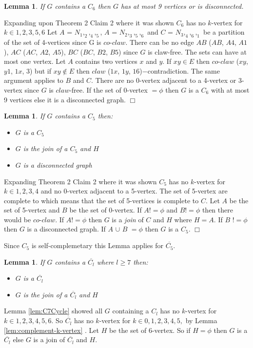 \documentclass[12pt]{article}
\newtheorem{Lemma}[Theorem]{Lemma}
\begin{document}
\begin{Lemma}\label{lem:C69V}
If $G$ contains a $C_6$ then $G$ has at most 9 vertices or is disconnected.
\end{Lemma}
 Expanding \cite{BraFud2002} upon Theorem 2 Claim 2 where it was shown $C_6$ has no $k$-vertex for $k \in {1, 2, 3, 5, 6}$ Let $A$ = $N_1,_2,_4,_5$, $A$ = $N_2,_3,_5,_6$ and $C$ = $N_3,_4,_6,_1$ be a partition of the set of 4-vertices since G is $co$-$claw$. There can be no edge $AB$ ($AB$, $A4$, $A1$), $AC$ ($AC$, $A2$, $A5$), $BC$ ($BC$, $B2$, $B5$) since $G$ is claw-free. The sets can have at most one vertex. Let $A$ contains two vertices $x$ and $y$. If $xy \in E$ then $co$-$claw$ ($xy$, $y1$, $1x$, $3$) but if $xy \not\in E$ then $claw$ ($1x$, $1y$, $16$)$-$contradiction. The same argument applies to $B$ and $C$. There are no 0-vertex adjacent to a 4-vertex or 3-vertex since $G$ is $claw$-free. If the set of 0-vertex $= \phi$ then $G$ is a $C_6$ with at most 9 vertices else it is a disconnected graph.  $\Box$



\medskip

\begin{Lemma}\label{lem:c5join}
If $G$ contains a $C_5$ then:
\begin{itemize}
\item[(i)]
$G$ is a $C_5$
\item[(i)]
$G$ is the join of a $C_5$ and $H$
\item[(i)]
$G$ is a disconnected graph
\end{itemize}
\end{Lemma}
 Expanding \cite{BraFud2002} Theorem 2 Claim 2 where it was shown $C_5$ has no $k$-vertex for $k \in {1,2,3,4}$ and no 0-vertex adjacent to a 5-vertex. The set of 5-vertex are complete to
 which means that the set of 5-vertices is complete to $C$. Let $A$ be the set of 5-vertex and $B$ be the set of 0-vertex. If $A != \phi$ and $B != \phi$ then there would be $co$-$claw$. If $A != \phi$ then $G$ is a {\it join} of $C$ and $H$ where $H = A$. If $B$ $!= \phi$ then  $G$ is a disconnected graph. If $A$ $\cup$ $B$ $= \phi$ then $G$ is a $C_5$.  $\Box$

Since $C_5$ is self-complemetary this Lemma applies for $\overline{C_5}$.
\medskip

\begin{Lemma}\label{lem:co-cl}
If $G$ contains a $\overline{C_l}$ where $l \geq 7$ then:
\begin{itemize}
\item[(i)]
$G$ is a $\overline{C_l}$
\item[(i)]
$G$ is the join of a $\overline{C_l}$ and $H$
\end{itemize}
\end{Lemma}
 Lemma \ref{lem:C7Cycle} showed all $G$ containing a $C_l$ has no $k$-vertex for $k \in {1, 2, 3, 4, 5, 6}$. So $\overline{C_l}$ has no $k$-vertex for $k \in {0, 1, 2, 3, 4, 5,}$ by Lemma \ref{lem:complement-k-vertex} . Let $H$ be the set of 6-vertex. So if $H = \phi$ then $G$ is a $\overline{C_l}$ else $G$ is a join of $\overline{C_l}$ and $H$.
\end{document}
